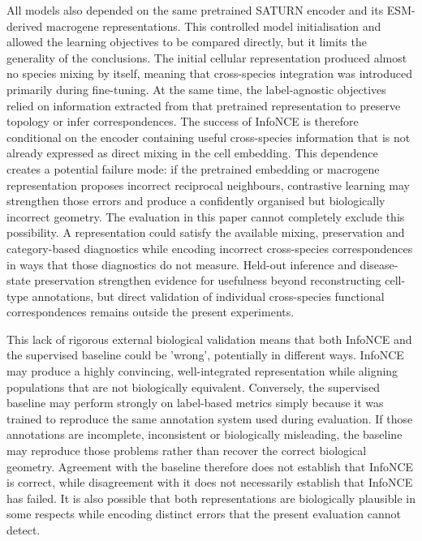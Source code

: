 \documentclass{article}
\begin{document}
All models also depended on the same pretrained SATURN encoder and its ESM-derived macrogene representations. This controlled model initialisation and allowed the learning objectives to be compared directly, but it limits the generality of the conclusions. The initial cellular representation produced almost no species mixing by itself, meaning that cross-species integration was introduced primarily during fine-tuning. At the same time, the label-agnostic objectives relied on information extracted from that pretrained representation to preserve topology or infer correspondences. The success of InfoNCE is therefore conditional on the encoder containing useful cross-species information that is not already expressed as direct mixing in the cell embedding. This dependence creates a potential failure mode: if the pretrained embedding or macrogene representation proposes incorrect reciprocal neighbours, contrastive learning may strengthen those errors and produce a confidently organised but biologically incorrect geometry. The evaluation in this paper cannot completely exclude this possibility. A representation could satisfy the available mixing, preservation and category-based diagnostics while encoding incorrect cross-species correspondences in ways that those diagnostics do not measure. Held-out inference and disease-state preservation strengthen evidence for usefulness beyond reconstructing cell-type annotations, but direct validation of individual cross-species functional correspondences remains outside the present experiments.

This lack of rigorous external biological validation means that both InfoNCE and the supervised baseline could be 'wrong', potentially in different ways. InfoNCE may produce a highly convincing, well-integrated representation while aligning populations that are not biologically equivalent. Conversely, the supervised baseline may perform strongly on label-based metrics simply because it was trained to reproduce the same annotation system used during evaluation. If those annotations are incomplete, inconsistent or biologically misleading, the baseline may reproduce those problems rather than recover the correct biological geometry. Agreement with the baseline therefore does not establish that InfoNCE is correct, while disagreement with it does not necessarily establish that InfoNCE has failed. It is also possible that both representations are biologically plausible in some respects while encoding distinct errors that the present evaluation cannot detect.
\end{document}
